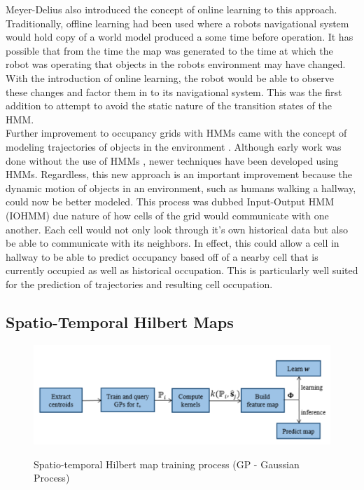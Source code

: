   Meyer-Delius \cite{Meyer-Delius2012} also introduced the concept of online
  learning to this approach. Traditionally, offline learning had been used where
  a robots navigational system would hold copy of a world model produced a some
  time before operation. It has possible that from the time the map was generated
  to the time at which the robot was operating that objects in the robots
  environment may have changed. With the introduction of online learning, the
  robot would be able to observe these changes and factor them in to its
  navigational system. This was the first addition to attempt to avoid the static
  nature of the transition states of the HMM. \\

  Further improvement to occupancy grids with HMMs came with the concept of
  modeling trajectories of objects in the environment
  \cite{Wang2015}. Although early work was done without the use of HMMs
  \cite{Kucner2013}, newer techniques have been developed using HMMs.
  Regardless, this new approach is an important improvement because the
  dynamic motion of objects in an environment, such as humans walking a
  hallway, could now be better modeled. This process was dubbed Input-Output
  HMM (IOHMM) due nature of how cells of the grid would communicate with one
  another. Each cell would not only look through it's own historical data but
  also be able to communicate with its neighbors. In effect, this could allow
  a cell in hallway to be able to predict occupancy based off of a nearby cell
  that is currently occupied as well as historical occupation. This is particularly
  well suited for the prediction of trajectories and resulting cell occupation.

  \subsection{ Spatio-Temporal Hilbert Maps }

  \begin{figure}[!htb]
    \centering
    \includegraphics[width=\linewidth]{images/STHM_diag.png}
    \caption{Spatio-temporal Hilbert map training process (GP - Gaussian Process)}
    \cite{Senanayake2016}
    \label{figure:STHM}
  \end{figure}

